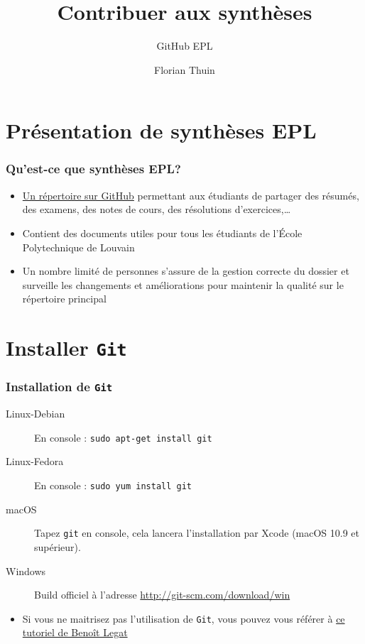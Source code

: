 \documentclass{beamer}
\title{Contribuer aux synthèses}
\subtitle{GitHub EPL}
\author{Florian Thuin}
\institute{École Polytechnique de Louvain}
\begin{document}
\begin{frame}[plain]
	\titlepage
\end{frame}



\section{Présentation de synthèses EPL}

\begin{frame}
	\frametitle{Qu'est-ce que synthèses EPL?}
		\begin{itemize}
 			\item \href{https://github.com/Gp2mv3/Syntheses}{Un répertoire sur GitHub} permettant aux étudiants de
 			    partager des résumés, des examens, des notes de cours,
 			    des résolutions d'exercices,\ldots
 			\item Contient des documents utiles pour tous les étudiants
 			    de l'École Polytechnique de Louvain
 			\item Un nombre limité de personnes s'assure de la gestion
 			    correcte du dossier et surveille les changements et
 			    améliorations pour maintenir la qualité sur le répertoire
 			    principal
 		\end{itemize}
\end{frame}

\section{Installer \texttt{Git}}

\begin{frame}[fragile]
    \frametitle{Installation de \lstinline|Git|}
    \begin{description}
        \item[Linux-Debian] En console : \lstinline|sudo apt-get install git|
        \item[Linux-Fedora] En console : \lstinline|sudo yum install git|
        \item[macOS] Tapez \lstinline|git| en console, cela lancera
            l'installation par Xcode (macOS 10.9 et supérieur).
        \item[Windows] Build officiel à l'adresse
            \url{http://git-scm.com/download/win}
    \end{description}
    \begin{itemize}
        \item Si vous ne maitrisez pas l'utilisation de \lstinline|Git|, vous pouvez
            vous référer à
            \href{http://sites.uclouvain.be/SystInfo/notes/Outils/html/git.html}{ce
            tutoriel de Benoît Legat}
    \end{itemize}
\end{frame}
\end{document}
